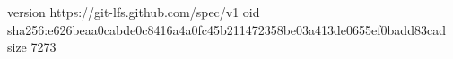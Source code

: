 version https://git-lfs.github.com/spec/v1
oid sha256:e626beaa0cabde0c8416a4a0fc45b211472358be03a413de0655ef0badd83cad
size 7273
